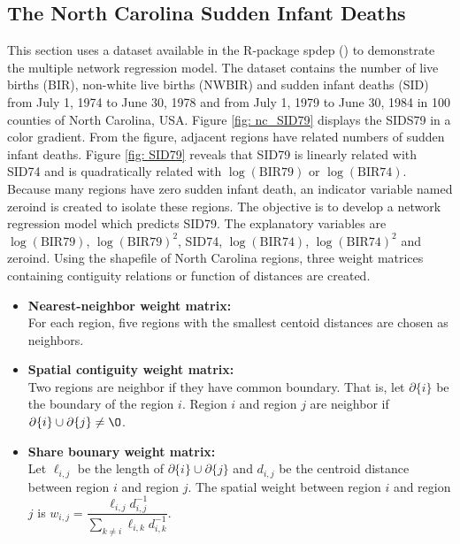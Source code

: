 \documentclass[times, doublespace]{auth}
\begin{document}
\subsection{The North Carolina Sudden Infant Deaths}
This section uses a dataset available in the R-package spdep (\cite{R20}) to demonstrate the multiple network regression model. The dataset contains the number of live births (BIR), non-white live births (NWBIR) and sudden infant deaths (SID) from July 1, 1974 to June 30, 1978 and from July 1, 1979 to June 30, 1984 in 100 counties of North Carolina, USA. Figure \ref{fig: nc_SID79} displays the SIDS79 in a color gradient. From the figure, adjacent regions have related numbers of sudden infant deaths. Figure \ref{fig: SID79} reveals that SID79 is linearly related with SID74 and is quadratically related with $\log(\text{BIR79})$ or $\log(\text{BIR74})$. Because many regions have zero sudden infant death, an indicator variable named zeroind is created to isolate these regions. The objective is to develop a network regression model which predicts SID79. The explanatory variables are $\log(\text{BIR79})$, $\log(\text{BIR79})^{2}$, SID74, $\log(\text{BIR74})$, $\log(\text{BIR74})^{2}$ and zeroind. Using the shapefile of North Carolina regions, three weight matrices containing contiguity relations or function of distances are created.
\begin{itemize}
	\item \textbf{Nearest-neighbor weight matrix:} \\
	For each region, five regions with the smallest centoid distances are chosen as neighbors. 
	\item \textbf{Spatial contiguity weight matrix:} \\
	Two regions are neighbor if they have common boundary. That is, let $\partial \{i\}$ be the boundary of the region $i$. Region $i$ and region $j$ are neighbor if $\partial \{i\} \cup \partial \{j\} \ne \O$.
	\item \textbf{Share bounary weight matrix:} \\
	Let $\ell_{i,j}$ be the length of $\partial \{i\} \cup \partial \{j\}$ and $d_{i,j}$ be the centroid distance between region $i$ and region $j$. The spatial weight between region $i$ and region $j$ is $w_{i,j} = \dfrac{\ell_{i,j}d_{i,j}^{-1}}{\sum\limits_{k \ne i} \ell_{i,k}d_{i,k}^{-1}}$.
\end{itemize}
\end{document}
